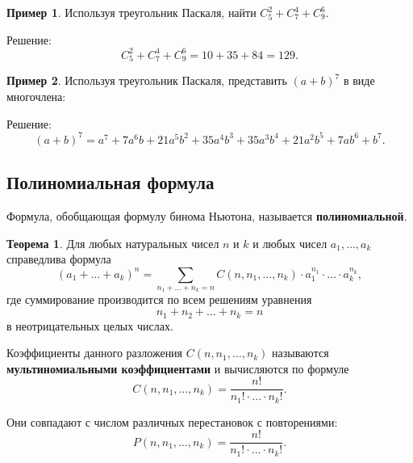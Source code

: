 \documentclass[a5paper, 11pt]{extarticle}
\theoremstyle{definition}
\newtheorem*{theorem*}{Теорема}
\newtheorem{example}{Пример}[subsection]
\theoremstyle{definition}
\theoremstyle{definition}
\numberwithin{figure}{section}
\numberwithin{table}{section}
\begin{document}
\begin{example}
    Используя треугольник Паскаля, найти \(C_5^2 + C_7^4 + C_9^6\).

    Решение:
    \[
        C_5^2 + C_7^4 + C_9^6 = 10 + 35 + 84 = 129.
    \]
\end{example}

\begin{example}
    Используя треугольник Паскаля, представить \((a + b)^7\) в виде многочлена:

    Решение:
    \[
        (a + b)^7 =
        a^7 + 7 a^6 b + 21 a^5 b^2 + 35 a^4 b^3 + 35 a^3 b^4 + 21 a^2 b^5 + 7 a b^6 + b^7.
    \]
\end{example}

\subsection{Полиномиальная формула}

Формула, обобщающая формулу бинома Ньютона, называется \textbf{полиномиальной}.

\begin{theorem*}
    Для любых натуральных чисел \(n\) и \(k\) и любых чисел \(a_1, \ldots, a_k\) справедлива формула
    \[
        (a_1 + \ldots + a_k)^n =
        \sum_{n_1 + \ldots + n_k = n} C(n, n_1, \ldots, n_k) \cdot a_1^{n_1} \cdot \ldots \cdot a_k^{n_k},
    \]
    где суммирование производится по всем решениям уравнения
    \[
        n_1 + n_2 + \ldots + n_k = n
    \]
    в неотрицательных целых числах.
\end{theorem*}

Коэффициенты данного разложения \(C(n, n_1, \ldots, n_k)\) называются \textbf{мультиномиальными коэффициентами} и вычисляются по формуле
\[
    C(n, n_1, \ldots, n_k) = \frac{n!}{n_1! \cdot \ldots \cdot n_k!}.
\]

Они совпадают с числом различных перестановок с повторениями:
\[
    P(n, n_1, \ldots, n_k) = \frac{n!}{n_1! \cdot \ldots \cdot n_k!}.
\]
\end{document}
